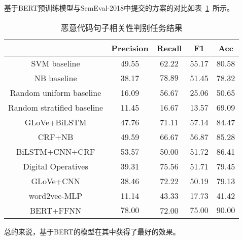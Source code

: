 基于BERT预训练模型与SemEval-2018中提交的方案的对比如表~\ref{tab:task1}~所示。
\begin{table}[htb]
	\renewcommand{\arraystretch}{1.3}
	\caption{恶意代码句子相关性判别任务结果}
	\label{tab:task1}
	\vspace{0.5em}\centering\wuhao
	\begin{tabular}{c c c c c }
		\toprule[1.5pt]  & Precision & Recall & F1 & Acc \\
		\midrule[1pt] 
		SVM baseline & 49.55 & 62.22 & 55.17 & 80.58 \\
		NB baseline  & 38.17 & $\mathbf{78.89}$ & 51.45 & 78.32 \\
		Random uniform baseline & 16.09 & 56.67 & 25.06 & 50.65 \\
 		Random stratified baseline & 11.45 & 16.67 & 13.57 & 69.09 \\
		GLoVe+BiLSTM\cite{RN102}& 47.76 & 71.11 & 57.14 & 84.47 \\
		CRF+NB\cite{RN103} & 49.59 & 66.67 & 56.87 & 85.28 \\
		BiLSTM+CNN+CRF\cite{RN104} & 53.57 & 50.00 & 51.72 & 86.41 \\
		Digital Operatives\cite{RN105} & 39.31 & 75.56 & 51.71 & 79.45 \\
		GLoVe+CNN\cite{RN106} & 38.46 & 72.22 & 50.19 & 79.13 \\
		word2vec-MLP\cite{RN101} & 11.14 & 43.33 & 17.73 & 41.42 \\
		BERT+FFNN & $\mathbf{78.00}$  & 72.00  &  $\mathbf{75.00}$ & $\mathbf{90.00}$\\
		\bottomrule[1.5pt] 
	\end{tabular}
\end{table}
总的来说，基于BERT的模型在其中获得了最好的效果。



